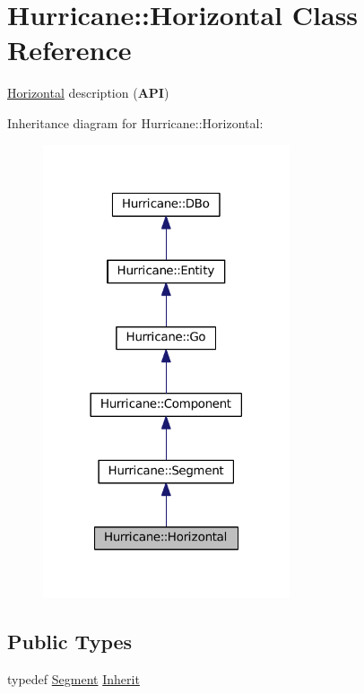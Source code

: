 \hypertarget{classHurricane_1_1Horizontal}{}\section{Hurricane\+:\+:Horizontal Class Reference}
\label{classHurricane_1_1Horizontal}


\mbox{\hyperlink{classHurricane_1_1Horizontal}{Horizontal}} description ({\bfseries A\+PI})  




Inheritance diagram for Hurricane\+:\+:Horizontal\+:\nopagebreak
\begin{figure}[H]
\begin{center}
\leavevmode
\includegraphics[width=206pt]{classHurricane_1_1Horizontal__inherit__graph}
\end{center}
\end{figure}
\subsection*{Public Types}
\begin{DoxyCompactItemize}
\item 
typedef \mbox{\hyperlink{classHurricane_1_1Segment}{Segment}} \mbox{\hyperlink{classHurricane_1_1Horizontal_a43266e3530dc5872f4eabf16eba86bdb}{Inherit}}
\end{DoxyCompactItemize}
